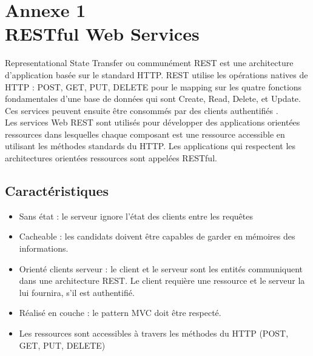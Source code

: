 \chapter*{Annexe 1
\\RESTful Web Services}
\makeatletter
\renewcommand{\thesection}{\@arabic\c@section}
\makeatother
\renewcommand\thefigure{\thesection.\arabic{figure}}    
\setcounter{figure}{0}

\renewcommand\thetable{\thesection.\arabic{table}}    
\setcounter{table}{0}
\setcounter{section}{0}

\qquad Representational State Transfer ou communément REST est une architecture d'application basée sur le standard HTTP. REST utilise les opérations natives de HTTP : POST, GET, PUT, DELETE pour le mapping sur les quatre fonctions fondamentales d'une base de données qui sont Create, Read, Delete, et Update. Ces services peuvent ensuite être consommés par des clients authentifiés \cite{7}.\\

Les services Web REST sont utilisés pour développer des applications orientées ressources dans lesquelles chaque composant est une ressource accessible en utilisant les méthodes standards du HTTP. Les applications qui respectent les architectures orientées ressources sont appelées RESTful.

\section{Caractéristiques}

\begin{itemize}
	\item Sans état : le serveur ignore l'état des clients entre les requêtes
	\item Cacheable : les candidats doivent être capables de garder en mémoires des informations.
	\item Orienté clients serveur : le client et le serveur sont les entités communiquent dans une architecture REST. Le client requière une ressource et le serveur la lui fournira, s'il est authentifié.
	\item Réalisé en couche : le pattern MVC doit être respecté.
	\item Les ressources sont accessibles à travers les méthodes du HTTP (POST, GET, PUT, DELETE)\\
\end{itemize}

